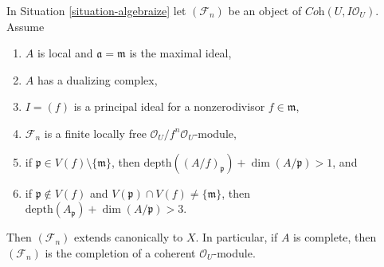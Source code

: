 \begin{lemma}
\label{lemma-algebraization-principal}
In Situation \ref{situation-algebraize} let $(\mathcal{F}_n)$ be an object
of $\textit{Coh}(U, I\mathcal{O}_U)$. Assume
\begin{enumerate}
\item $A$ is local and $\mathfrak a = \mathfrak m$ is the maximal ideal,
\item $A$ has a dualizing complex,
\item $I = (f)$ is a principal ideal for a nonzerodivisor $f \in \mathfrak m$,
\item $\mathcal{F}_n$ is a finite locally free
$\mathcal{O}_U/f^n\mathcal{O}_U$-module,
\item if $\mathfrak p \in V(f) \setminus \{\mathfrak m\}$, then
$\text{depth}((A/f)_\mathfrak p) + \dim(A/\mathfrak p) > 1$, and
\item if $\mathfrak p \not \in V(f)$ and
$V(\mathfrak p) \cap V(f) \not = \{\mathfrak m\}$, then
$\text{depth}(A_\mathfrak p) + \dim(A/\mathfrak p) > 3$.
\end{enumerate}
Then $(\mathcal{F}_n)$ extends canonically to $X$. In particular, if $A$
is complete, then $(\mathcal{F}_n)$ is the completion of a coherent
$\mathcal{O}_U$-module.
\end{lemma}

